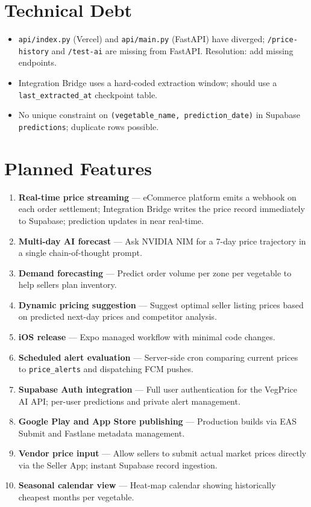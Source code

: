 \documentclass[12pt, a4paper, oneside]{report}
\begin{document}
\section{Technical Debt}

\begin{itemize}
  \item \texttt{api/index.py} (Vercel) and \texttt{api/main.py} (FastAPI)
        have diverged; \texttt{/price-history} and \texttt{/test-ai} are
        missing from FastAPI. Resolution: add missing endpoints.
  \item Integration Bridge uses a hard-coded extraction window; should use
        a \texttt{last\_extracted\_at} checkpoint table.
  \item No unique constraint on \texttt{(vegetable\_name, prediction\_date)}
        in Supabase \texttt{predictions}; duplicate rows possible.
\end{itemize}

\section{Planned Features}

\begin{enumerate}
  \item \textbf{Real-time price streaming} --- eCommerce platform emits a
        webhook on each order settlement; Integration Bridge writes the price
        record immediately to Supabase; prediction updates in near real-time.
  \item \textbf{Multi-day AI forecast} --- Ask NVIDIA NIM for a 7-day price
        trajectory in a single chain-of-thought prompt.
  \item \textbf{Demand forecasting} --- Predict order volume per zone per
        vegetable to help sellers plan inventory.
  \item \textbf{Dynamic pricing suggestion} --- Suggest optimal seller listing
        prices based on predicted next-day prices and competitor analysis.
  \item \textbf{iOS release} --- Expo managed workflow with minimal code changes.
  \item \textbf{Scheduled alert evaluation} --- Server-side cron comparing
        current prices to \texttt{price\_alerts} and dispatching FCM pushes.
  \item \textbf{Supabase Auth integration} --- Full user authentication for the
        VegPrice AI API; per-user predictions and private alert management.
  \item \textbf{Google Play and App Store publishing} --- Production builds via
        EAS Submit and Fastlane metadata management.
  \item \textbf{Vendor price input} --- Allow sellers to submit actual market
        prices directly via the Seller App; instant Supabase record ingestion.
  \item \textbf{Seasonal calendar view} --- Heat-map calendar showing
        historically cheapest months per vegetable.
\end{enumerate}
\end{document}
